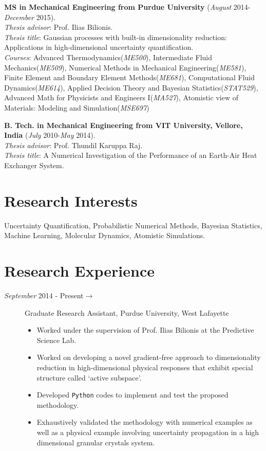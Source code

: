 \documentclass[margin,line,a4paper]{resume}
\begin{document}
\begin{resume}
    \textbf{MS in Mechanical Engineering from
    Purdue University} (\textit{August} 2014-\textit{December} 2015). \\
    \textit{Thesis advisor}: Prof. Ilias Bilionis. \\
    \textit{Thesis title}: Gaussian processes with built-in dimensionality reduction: Applications in high-dimensional uncertainty quantification. \\
    \textit{Courses}: Advanced Thermodynamics(\textit{ME500}),  Intermediate Fluid Mechanics(\textit{ME509}),  Numerical Methods in Mechanical Engineering(\textit{ME581}),  Finite Element and Boundary Element Methods(\textit{ME681}),  Computational Fluid Dynamics(\textit{ME614}),  Applied Decision Theory and Bayesian Statistics(\textit{STAT529}),  Advanced Math for Physicists and Engineers I(\textit{MA527}),  Atomistic view of Materials: Modeling and Simulation(\textit{MSE697})

    \textbf{B. Tech. in Mechanical Engineering from VIT University, Vellore, India}
    (\textit{July} 2010-\textit{May} 2014). \\
    \textit{Thesis advisor}: Prof. Thundil Karuppa Raj. \\
    \textit{Thesis title}: A Numerical Investigation of the Performance of an Earth-Air Heat Exchanger System.




\section{\mysidestyle Research Interests}
Uncertainty Quantification, Probabilistic Numerical Methods, Bayesian Statistics, Machine Learning, Molecular Dynamics, Atomistic Simulations.




\section{\mysidestyle Research Experience}
\begin{description}
\item[\textit{September} 2014 - Present$\rightarrow$] Graduate Research Assistant, Purdue University, West Lafayette
\begin{itemize}
\item Worked under the supervision of Prof. Ilias Bilionis at the Predictive Science Lab.
\item Worked on developing a novel gradient-free approach to dimensionality reduction in high-dimensional physical responses that exhibit special structure called `active subspace'.
\item Developed \texttt{Python} codes to implement and test the proposed methodology.
\item Exhaustively validated the methodology with numerical examples as well as a physical example involving uncertainty propagation in a high dimensional granular crystals system.
\end{itemize}
\end{description}





\end{resume}
\end{document}
